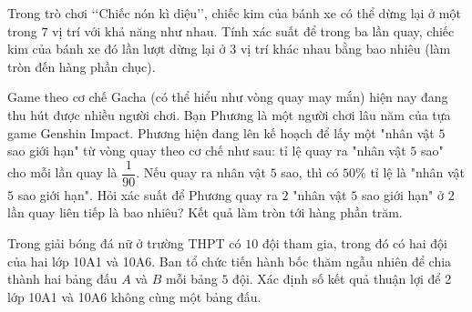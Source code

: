 \begin{bt}%
	Trong trò chơi \lq\lq Chiếc nón kì diệu\rq\rq, chiếc kim của bánh xe có thể dừng lại ở một trong $7$ vị trí với khả năng như nhau. Tính xác suất để trong ba lần quay, chiếc kim của bánh xe đó lần lượt dừng lại ở $3$ vị trí khác nhau bằng bao nhiêu (làm tròn đến hàng phần chục).
\end{bt}

\begin{bt}%
	Game theo cơ chế Gacha (có thể hiểu như vòng quay may mắn) hiện nay đang thu hút được nhiều người chơi. Bạn Phương là một người chơi lâu năm của tựa game Genshin Impact. Phương hiện đang lên kế hoạch để lấy một "nhân vật $5$ sao giới hạn" từ vòng quay theo cơ chế như sau: tỉ lệ quay ra "nhân vật $5$ sao" cho mỗi lần quay là $\dfrac{1}{90}$. Nếu quay ra nhân vật $5$ sao, thì có $50\%$ tỉ lệ là "nhân vật $5$ sao giới hạn".
 Hỏi xác suất để Phương quay ra $2$ "nhân vật $5$ sao giới hạn" ở $2$ lần quay liên tiếp là bao nhiêu? Kết quả làm tròn tới hàng phần trăm.
\end{bt}

\begin{bt}%
Trong giải bóng đá nữ ở trường THPT có $10$ đội tham gia, trong đó có hai đội của hai lớp 10A1  và  10A6. Ban tổ chức tiến hành bốc thăm ngẫu nhiên để chia thành hai bảng đấu $A$ và $B$  mỗi bảng $5$ đội. Xác định số kết quả thuận lợi để 2 lớp 10A1 và 10A6 không cùng một bảng đấu.
\end{bt}

